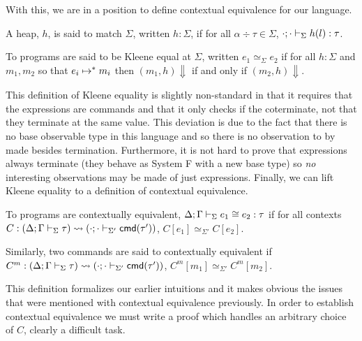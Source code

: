 With this, we are in a position to define contextual equivalence for
our language.
\begin{defn}\label{def:language:heapmatch}
  A heap, $h$, is said to match $\Sigma$, written $h : \Sigma$, if for
  all $\alpha \div \tau \in \Sigma$,
  $\cdot; \cdot \vdash_{\Sigma} h(l) \mathrel{:} \tau$.
\end{defn}
\begin{defn}\label{def:language:kleene}
  To programs are said to be Kleene equal at $\Sigma$, written
  $e_1 \simeq_\Sigma e_2$ if for all $h : \Sigma$ and $m_1, m_2$ so
  that $e_i \mapsto^* m_i$ then $(m_1, h) \Downarrow$ if and only if
  $(m_2, h) \Downarrow$.
\end{defn}
This definition of Kleene equality is slightly non-standard in that it
requires that the expressions are commands and that it only checks if
the coterminate, not that they terminate at the same value. This
deviation is due to the fact that there is no base observable type in
this language and so there is no observation to by made besides
termination. Furthermore, it is not hard to prove that expressions
always terminate (they behave as System F with a new base
type) so \emph{no} interesting observations may be made of just
expressions. Finally, we can lift Kleene equality to a definition of
contextual equivalence.
\begin{defn}\label{def:language:cxt}
  To programs are contextually equivalent,
  $\Delta; \Gamma \vdash_{\Sigma} e_1 \cong e_2 \mathrel{:} \tau$ if for all
  contexts
  $C : (\Delta; \Gamma \vdash_{\Sigma} \tau) \rightsquigarrow (\cdot; \cdot \vdash_{\Sigma'} \mathsf{cmd}(\tau'))$,
  $C[e_1] \simeq_{\Sigma'} C[e_2]$.

  Similarly, two commands are said to contextually equivalent if
  $C^m : (\Delta; \Gamma \vdash_{\Sigma} \tau) \rightsquigarrow (\cdot; \cdot \vdash_{\Sigma'} \mathsf{cmd}(\tau'))$,
  $C^m[m_1] \simeq_{\Sigma'} C^m[m_2]$.
\end{defn}
This definition formalizes our earlier intuitions and it makes obvious
the issues that were mentioned with contextual equivalence previously.
In order to establish contextual equivalence we must write a proof
which handles an arbitrary choice of $C$, clearly a difficult
task.


